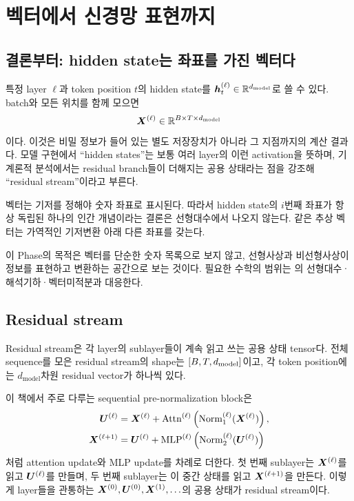 \chapter{벡터에서 신경망 표현까지}
\label{chap:phase1}

\section{결론부터: hidden state는 좌표를 가진 벡터다}

특정 layer $\ell$과 token position $t$의 hidden state를 $\bm{h}^{(\ell)}_t\in\mathbb{R}^{d_{\text{model}}}$로 쓸 수 있다.
batch와 모든 위치를 함께 모으면
\begin{equation}
  \bm{X}^{(\ell)}\in
  \mathbb{R}^{B\times T\times d_{\text{model}}}
\end{equation}
이다.
이것은 비밀 정보가 들어 있는 별도 저장장치가 아니라 그 지점까지의 계산 결과다.
모델 구현에서 ``hidden states''는 보통 여러 layer의 이런 activation을 뜻하며, 기계론적 분석에서는 residual branch들이 더해지는 공용 상태라는 점을 강조해 ``residual stream''이라고 부른다.

\begin{factbox}
벡터는 기저를 정해야 숫자 좌표로 표시된다.
따라서 hidden state의 $i$번째 좌표가 항상 독립된 하나의 인간 개념이라는 결론은 선형대수에서 나오지 않는다.
같은 추상 벡터는 가역적인 기저변환 아래 다른 좌표를 갖는다.
\end{factbox}

이 Phase의 목적은 벡터를 단순한 숫자 목록으로 보지 않고, 선형사상과 비선형사상이 정보를 표현하고 변환하는 공간으로 보는 것이다.
필요한 수학의 범위는 \citet{deisenroth2020mml}의 선형대수·해석기하·벡터미적분과 대응한다.

\section{Residual stream}

Residual stream은 각 layer의 sublayer들이 계속 읽고 쓰는 공용 상태 tensor다.
전체 sequence를 모은 residual stream의 shape는 $\left[B,T,d_{\text{model}}\right]$이고, 각 token position에는 $d_{\text{model}}$차원 residual vector가 하나씩 있다.

이 책에서 주로 다루는 sequential pre-normalization block은
\begin{align}
  \bm{U}^{(\ell)}
    &=\bm{X}^{(\ell)}+\operatorname{Attn}^{(\ell)}
      \left(\operatorname{Norm}^{(\ell)}_1(\bm{X}^{(\ell)})\right), \\
  \bm{X}^{(\ell+1)}
    &=\bm{U}^{(\ell)}+\operatorname{MLP}^{(\ell)}
      \left(\operatorname{Norm}^{(\ell)}_2(\bm{U}^{(\ell)})\right)
\end{align}
처럼 attention update와 MLP update를 차례로 더한다.
첫 번째 sublayer는 $\bm{X}^{(\ell)}$를 읽고 $\bm{U}^{(\ell)}$를 만들며, 두 번째 sublayer는 이 중간 상태를 읽고 $\bm{X}^{(\ell+1)}$을 만든다.
이렇게 layer들을 관통하는 $\bm{X}^{(0)},\bm{U}^{(0)},\bm{X}^{(1)},\ldots$의 공용 상태가 residual stream이다.


